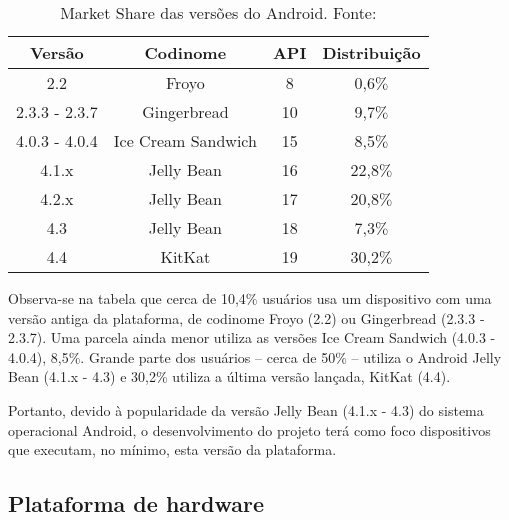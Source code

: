\begin{table}[h!]

\caption[Market Share das versões do Android]{Market Share das versões do Android. Fonte: \cite{androidDevDashboards}}
\begin{center}
\begin{tabular}{|c|c|c|c|}
\hline
\textbf{Versão}     &\textbf{Codinome}      & \textbf{API}      &\textbf{Distribuição} \\ \hline \hline
2.2                 & Froyo                 & 8                 & 0,6$\%$	\\
2.3.3 - 2.3.7       & Gingerbread           & 10                & 9,7$\%$	\\
4.0.3 - 4.0.4       & Ice Cream Sandwich    & 15                & 8,5$\%$	\\
4.1.x               & Jelly Bean            & 16                & 22,8$\%$	\\
4.2.x               & Jelly Bean            & 17                & 20,8$\%$	\\
4.3                 & Jelly Bean            & 18                & 7,3$\%$	\\
4.4                 & KitKat                & 19                & 30,2$\%$	\\ \hline
\end{tabular}%
\end{center}
\label{tab:marketShare}
\end{table}

Observa-se na tabela que cerca de 10,4$\%$ usuários usa um dispositivo com uma versão antiga da plataforma, de codinome Froyo (2.2) ou Gingerbread (2.3.3 - 2.3.7). Uma parcela ainda menor utiliza as versões Ice Cream Sandwich (4.0.3 - 4.0.4), 8,5$\%$. Grande parte dos usuários -- cerca de 50$\%$ -- utiliza o Android Jelly Bean (4.1.x - 4.3) e 30,2$\%$ utiliza a última versão lançada, KitKat (4.4).

Portanto, devido à popularidade da versão Jelly Bean (4.1.x - 4.3) do sistema operacional Android, o desenvolvimento do projeto terá como foco dispositivos que executam, no mínimo, esta versão da plataforma.

\subsection{Plataforma de hardware}

